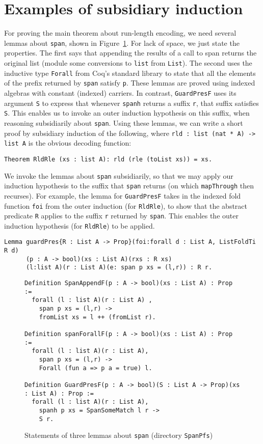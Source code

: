 \documentclass[a4paper,USenglish]{lipics-v2021}
\begin{document}
\section{Examples of subsidiary induction}
\label{sec:examplesi}

For proving the main theorem about run-length encoding, we need
several lemmas about \verb|span|, shown in Figure~\ref{fig:spanlem}.
For lack of space, we just state the properties.  The first says that
appending the results of a call to span returns the original list
(module some conversions to \verb|list| from \verb|List|).  The second
uses the inductive type \verb|Forall| from Coq's standard library to
state that all the elements of the prefix returned by \verb|span|
satisfy \verb|p|.  These lemmas are proved using indexed algebras with
constant (indexed) carriers.  In contrast, \verb|GuardPresF| uses its
argument \verb|S| to express that whenever \verb|spanh| returns a
suffix \verb|r|, that suffix satisfies \verb|S|.  This enables us to
invoke an outer induction hypothesis on this suffix, when reasoning
subsidiarily about \verb|span|.  Using these lemmas, we can write a
short proof by subsidiary induction of the following, where
\verb|rld : list (nat * A) -> list A| is the obvious decoding
function:

\begin{verbatim}
Theorem RldRle (xs : list A): rld (rle (toList xs)) = xs.  
\end{verbatim}

\noindent We invoke the lemmas about \verb|span| subsidiarily,
so that we may apply our induction hypothesis to the suffix
that \verb|span| returns (on which \verb|mapThrough| then recurses).
For example, the lemma for \verb|GuardPresF| takes in the
indexed fold function \verb|foi| from the outer induction (for \verb|RldRle|),
to show that the abstract predicate \verb|R| applies to the suffix
\verb|r| returned by \verb|span|.  This enables the outer induction
hypothesis (for \verb|RldRle|) to be applied.

\begin{verbatim}
Lemma guardPres{R : List A -> Prop}(foi:forall d : List A, ListFoldTi R d)
      (p : A -> bool)(xs : List A)(rxs : R xs)
      (l:list A)(r : List A)(e: span p xs = (l,r)) : R r.
\end{verbatim} 

\begin{figure}
\begin{verbatim}
Definition SpanAppendF(p : A -> bool)(xs : List A) : Prop :=
  forall (l : list A)(r : List A) ,
    span p xs = (l,r) ->
    fromList xs = l ++ (fromList r).

Definition spanForallF(p : A -> bool)(xs : List A) : Prop :=
  forall (l : list A)(r : List A),
    span p xs = (l,r) ->
    Forall (fun a => p a = true) l.

Definition GuardPresF(p : A -> bool)(S : List A -> Prop)(xs : List A) : Prop :=
  forall (l : list A)(r : List A),
    spanh p xs = SpanSomeMatch l r ->
    S r.
\end{verbatim}
\caption{Statements of three lemmas about \texttt{span} (directory \texttt{SpanPfs})}
\label{fig:spanlem}
\end{figure}
\end{document}
